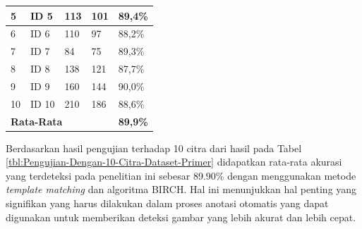 \begin{singlespace}
\begin{table}[H]
\begin{tabular}{|m{0.5cm}m{1cm}m{3cm}m{3cm}|m{3cm}|}
			\multicolumn{1}{|m{0.5cm}|}{5}  & \multicolumn{1}{m{2cm}|}{ID 5}      & \multicolumn{1}{m{3cm}|}{113}                          & 101                                & 89,4\%              \\ \hline
			
			\multicolumn{1}{|m{0.5cm}|}{6}  & \multicolumn{1}{m{2cm}|}{ID 6}      & \multicolumn{1}{m{3cm}|}{110}                          & 97                                 & 88,2\%              \\ \hline
			
			\multicolumn{1}{|m{0.5cm}|}{7}  & \multicolumn{1}{m{2cm}|}{ID 7}      & \multicolumn{1}{m{3cm}|}{84}                           & 75                                 & 89,3\%              \\ \hline
			
			\multicolumn{1}{|m{0.5cm}|}{8}  & \multicolumn{1}{m{2cm}|}{ID 8}      & \multicolumn{1}{m{3cm}|}{138}                          & 121                                & 87,7\%              \\ \hline
			
			\multicolumn{1}{|m{0.5cm}|}{9}  & \multicolumn{1}{m{2cm}|}{ID 9}      & \multicolumn{1}{m{3cm}|}{160}                          & 144                                & 90,0\%              \\ \hline
			
			\multicolumn{1}{|m{0.5cm}|}{10} & \multicolumn{1}{m{2cm}|}{ID 10}     & \multicolumn{1}{m{3cm}|}{210}                          & 186                                & 88,6\%              \\ \hline
		
			\multicolumn{4}{|l|}{\textbf{Rata-Rata}}                                                                                                           & \textbf{89,9\%}     \\ \hline
		\end{tabular}
	\end{table}
\end{singlespace}

Berdasarkan hasil pengujian terhadap 10 citra dari hasil pada Tabel \ref{tbl:Pengujian-Dengan-10-Citra-Dataset-Primer} didapatkan rata-rata akurasi yang terdeteksi pada penelitian ini sebesar 89.90\% dengan menggunakan metode \textit{template matching} dan algoritma BIRCH. Hal ini menunjukkan hal penting yang signifikan yang harus dilakukan dalam proses anotasi otomatis yang dapat digunakan untuk memberikan deteksi gambar yang lebih akurat dan lebih cepat.

